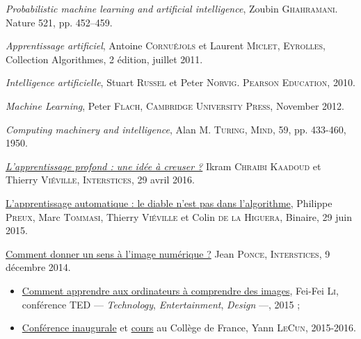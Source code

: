 \begin{tcolorbox}[title={Bibliographie circonstanciée}, toprule=0pt, leftrule=0pt, rightrule=0pt, arc=0pt,
                  fonttitle=\scshape\boxtitlefont,
                  colbacktitle=white, coltitle=fourthcolor, colframe=fourthcolor, colback=fourthcolor!10,
                  breakable, enhanced jigsaw]
\begin{jazzitemize}
\item \textit{Probabilistic machine learning and artificial intelligence}, Zoubin \textsc{Ghahramani}. Nature 521, pp. 452–459.
\item \textit{Apprentissage artificiel}, Antoine \textsc{Cornuéjols} et Laurent \textsc{Miclet}, \textsc{Eyrolles}, Collection Algorithmes, 2 édition, juillet 2011.
\item \textit{Intelligence artificielle}, Stuart \textsc{Russel} et Peter \textsc{Norvig}. \textsc{Pearson Education}, 2010.
\item \textit{Machine Learning}, Peter \textsc{Flach}, \textsc{Cambridge University Press}, November 2012.
\item \textit{Computing machinery and intelligence}, Alan M. \textsc{Turing}, \textsc{Mind}, 59, pp. 433-460, 1950.
\item \href{https://interstices.info/lapprentissage-profond-une-idee-a-creuser/}{\textit{L’apprentissage profond : une idée à creuser ?}}  Ikram \textsc{Chraibi Kaadoud} et Thierry \textsc{Viéville}, \textsc{Interstices}, 29 avril 2016.
\item \href{https://www.lemonde.fr/blog/binaire/2015/06/29/lapprentissage-automatique-le-diable-nest-pas-dans-lalgorithme/}{L’apprentissage automatique : le diable n’est pas dans l’algorithme}, Philippe \textsc{Preux}, Marc \textsc{Tommasi}, Thierry \textsc{Viéville} et Colin \textsc{de la Higuera}, Binaire, 29 juin 2015.
\item \href{https://interstices.info/comment-donner-un-sens-a-limage-numerique/}{Comment donner un sens à l’image numérique ?}  Jean \textsc{Ponce}, \textsc{Interstices}, 9 décembre 2014.
\end{jazzitemize}
\end{tcolorbox}

\begin{gofurther}
\begin{itemize}\jazzitem
\item \href{https://www.ted.com/talks/fei_fei_li_how_we_re_teaching_computers_to_understand_pictures?language=fr}{Comment apprendre aux ordinateurs à comprendre des images}, Fei-Fei \textsc{Li}, conférence TED --- \textit{Technology}, \textit{Entertainment}, \textit{Design} ---, 2015 ;
\item \href{https://www.college-de-france.fr/site/yann-lecun/inaugural-lecture-2016-02-04-18h00.htm}{Conférence inaugurale} et \href{https://www.college-de-france.fr/site/yann-lecun/_audiovideos.htm}{cours} au Collège de France, Yann \textsc{LeCun}, 2015-2016.
\end{itemize}
\end{gofurther}



